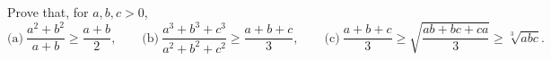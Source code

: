 Prove that, for $a, b, c > 0$,
\[ \text{(a)}\ \frac{a^2 + b^2}{a + b} \geq \frac{a + b}{2},\qquad \text{(b)}\ \frac{a^3 + b^3 + c^3}{a^2 + b^2 + c^2} \geq \frac{a + b + c}{3},\qquad \text{(c)}\ \frac{a + b + c}{3} \geq \sqrt{\frac{ab + bc + ca}{3}} \geq \sqrt[3]{abc}. \]
